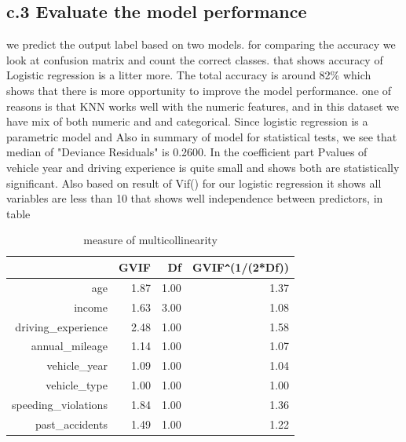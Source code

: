 \documentclass[a4paper, 11pt]{article}
\begin{document}
\subsection*{c.3 Evaluate the model performance}
we predict the output label based on two models. for comparing the accuracy we look at confusion matrix and count the correct classes. that shows accuracy of Logistic regression is a litter more. The total accuracy is around 82\%  which shows that there is more opportunity to improve the model performance.
one of reasons is that KNN works well with the numeric features, and in this dataset we have mix of both numeric and and categorical. 
Since logistic regression is a parametric model and 
Also in summary of model for statistical tests, we see that median of "Deviance Residuals" is 0.2600. In the coefficient part Pvalues of vehicle year and driving experience is quite small and shows both are statistically significant\cite{Gareth2013}. Also based on result of Vif() for our logistic regression it shows all variables are less than 10 that shows well independence between predictors, in table
\begin{table}[H]
	\centering
	 \caption{measure of multicollinearity}
	\begin{tabular}{rrrr}
		\hline
		& GVIF & Df & GVIF\verb|^|(1/(2*Df)) \\ 
		\hline
		age & 1.87 & 1.00 & 1.37 \\ 
		income & 1.63 & 3.00 & 1.08 \\ 
		driving\_experience & 2.48 & 1.00 & 1.58 \\ 
		annual\_mileage & 1.14 & 1.00 & 1.07 \\ 
		vehicle\_year & 1.09 & 1.00 & 1.04 \\ 
		vehicle\_type & 1.00 & 1.00 & 1.00 \\ 
		speeding\_violations & 1.84 & 1.00 & 1.36 \\ 
		past\_accidents & 1.49 & 1.00 & 1.22 \\ 
		\hline
	\end{tabular}
\end{table}




	\newpage
	
	
	
\end{document}
